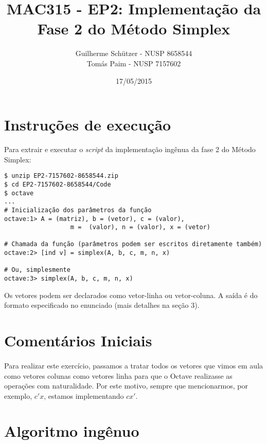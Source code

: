 \documentclass[a4paper]{article}
\title{MAC315 - EP2: Implementação da Fase 2 do Método Simplex}
\author{
	Guilherme Schützer - NUSP 8658544 \\
	Tomás Paim         - NUSP 7157602
}
\date{17/05/2015}
\begin{document}
\maketitle

\section{Instruções de execução}

Para extrair e executar o \emph{script} da implementação ingênua da fase 2 do Método Simplex:

\begin{verbatim}
$ unzip EP2-7157602-8658544.zip
$ cd EP2-7157602-8658544/Code
$ octave
...
# Inicialização dos parâmetros da função
octave:1> A = (matriz), b = (vetor), c = (valor),
		          m =  (valor), n = (valor), x = (vetor)

# Chamada da função (parâmetros podem ser escritos diretamente também)
octave:2> [ind v] = simplex(A, b, c, m, n, x)

# Ou, simplesmente
octave:3> simplex(A, b, c, m, n, x)

\end{verbatim}

Os vetores podem ser declarados como vetor-linha ou vetor-coluna. A saída é do formato especificado no enunciado (mais detalhes na seção 3).

\section{Comentários Iniciais}

\paragraph{}
Para realizar este exercício, passamos a tratar todos os vetores que vimos em aula como vetores colunas como vetores linha para que o Octave realizasse as operações com naturalidade. Por este motivo, sempre que mencionarmos, por exemplo, $c'x$, estamos implementando $cx'$.

\section{Algoritmo ingênuo}
\end{document}
